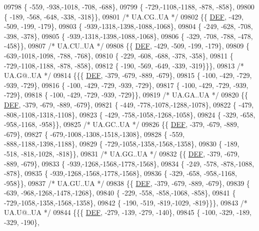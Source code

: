 \begin{DoxyCode}
09798 \{ -559, -938,-1018, -708, -688\},
09799 \{ -729,-1108,-1188, -878, -858\},
09800 \{ -189, -568, -648, -338, -318\}\},
09801 \textcolor{comment}{/* UA.CG..UA */}
09802 \{\{  \mbox{\hyperlink{1_88_84__epars_8h_a397419fc12b37ed479c8abb9d444d843}{DEF}}, -429, -509, -199, -179\},
09803 \{ -939,-1318,-1398,-1088,-1068\},
09804 \{ -249, -628, -708, -398, -378\},
09805 \{ -939,-1318,-1398,-1088,-1068\},
09806 \{ -329, -708, -788, -478, -458\}\},
09807 \textcolor{comment}{/* UA.CU..UA */}
09808 \{\{  \mbox{\hyperlink{1_88_84__epars_8h_a397419fc12b37ed479c8abb9d444d843}{DEF}}, -429, -509, -199, -179\},
09809 \{ -639,-1018,-1098, -788, -768\},
09810 \{ -229, -608, -688, -378, -358\},
09811 \{ -729,-1108,-1188, -878, -858\},
09812 \{ -190, -569, -649, -339, -319\}\}\},
09813 \textcolor{comment}{/* UA.G@..UA */}
09814 \{\{\{  \mbox{\hyperlink{1_88_84__epars_8h_a397419fc12b37ed479c8abb9d444d843}{DEF}}, -379, -679, -889, -679\},
09815 \{ -100, -429, -729, -939, -729\},
09816 \{ -100, -429, -729, -939, -729\},
09817 \{ -100, -429, -729, -939, -729\},
09818 \{ -100, -429, -729, -939, -729\}\},
09819 \textcolor{comment}{/* UA.GA..UA */}
09820 \{\{  \mbox{\hyperlink{1_88_84__epars_8h_a397419fc12b37ed479c8abb9d444d843}{DEF}}, -379, -679, -889, -679\},
09821 \{ -449, -778,-1078,-1288,-1078\},
09822 \{ -479, -808,-1108,-1318,-1108\},
09823 \{ -429, -758,-1058,-1268,-1058\},
09824 \{ -329, -658, -958,-1168, -958\}\},
09825 \textcolor{comment}{/* UA.GC..UA */}
09826 \{\{  \mbox{\hyperlink{1_88_84__epars_8h_a397419fc12b37ed479c8abb9d444d843}{DEF}}, -379, -679, -889, -679\},
09827 \{ -679,-1008,-1308,-1518,-1308\},
09828 \{ -559, -888,-1188,-1398,-1188\},
09829 \{ -729,-1058,-1358,-1568,-1358\},
09830 \{ -189, -518, -818,-1028, -818\}\},
09831 \textcolor{comment}{/* UA.GG..UA */}
09832 \{\{  \mbox{\hyperlink{1_88_84__epars_8h_a397419fc12b37ed479c8abb9d444d843}{DEF}}, -379, -679, -889, -679\},
09833 \{ -939,-1268,-1568,-1778,-1568\},
09834 \{ -249, -578, -878,-1088, -878\},
09835 \{ -939,-1268,-1568,-1778,-1568\},
09836 \{ -329, -658, -958,-1168, -958\}\},
09837 \textcolor{comment}{/* UA.GU..UA */}
09838 \{\{  \mbox{\hyperlink{1_88_84__epars_8h_a397419fc12b37ed479c8abb9d444d843}{DEF}}, -379, -679, -889, -679\},
09839 \{ -639, -968,-1268,-1478,-1268\},
09840 \{ -229, -558, -858,-1068, -858\},
09841 \{ -729,-1058,-1358,-1568,-1358\},
09842 \{ -190, -519, -819,-1029, -819\}\}\},
09843 \textcolor{comment}{/* UA.U@..UA */}
09844 \{\{\{  \mbox{\hyperlink{1_88_84__epars_8h_a397419fc12b37ed479c8abb9d444d843}{DEF}}, -279, -139, -279, -140\},
09845 \{ -100, -329, -189, -329, -190\},

\end{DoxyCode}
